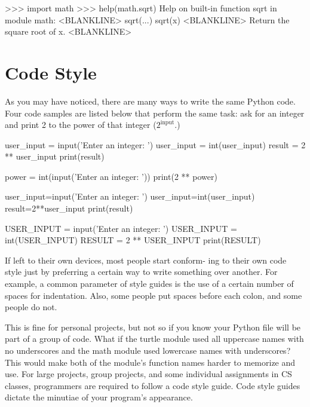 \documentclass[11pt]{cselabheader}
\begin{document}
\begin{pyconcode}
>>> import math
>>> help(math.sqrt)
Help on built-in function sqrt in module math:
<BLANKLINE>
sqrt(...)
    sqrt(x)
<BLANKLINE>
    Return the square root of x.
<BLANKLINE>

\end{pyconcode}


\section{Code Style}

As you may have noticed, there are many ways to write the
same Python code. Four code samples are listed below that
perform the same task: ask for an integer and print 2 to the
power of that integer ($2^\text{input}$.)

\begin{multicols}{2}
\begin{python3code}
user_input = input('Enter an integer: ')
user_input = int(user_input)
result = 2 ** user_input
print(result)
\end{python3code}

\begin{python3code}
power = int(input('Enter an integer: '))
print(2 ** power)
\end{python3code}

\columnbreak

\begin{python3code}
user_input=input('Enter an integer: ')
user_input=int(user_input)
result=2**user_input
print(result)
\end{python3code}

\begin{python3code}
USER_INPUT = input('Enter an integer: ')
USER_INPUT = int(USER_INPUT)
RESULT = 2 ** USER_INPUT
print(RESULT)
\end{python3code}
\end{multicols}


If left to their own devices, most people start conform- ing to their
own code style just by preferring a certain way to write something
over another. For example, a common parameter of style guides is the use
of a certain number of spaces for indentation. Also, some people put
spaces before each colon, and some people do not.

This is fine for personal projects, but not so if you know your Python
file will be part of a group of code.
What if the turtle module used all uppercase names with no underscores and
the math module used lowercase names with underscores? This would make
both of the module's function names harder to memorize and use.  For large
projects, group projects, and some individual assignments in CS
classes, programmers are required to follow a code style guide.
Code style guides dictate the minutiae of your program's appearance.
\end{document}
